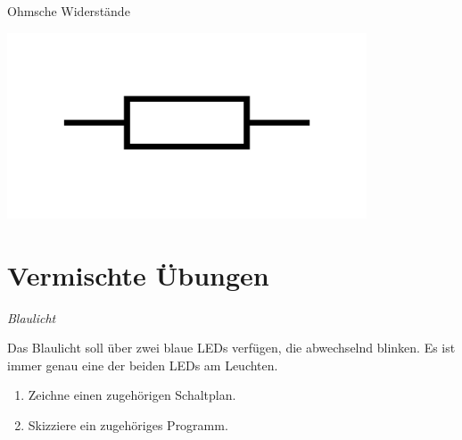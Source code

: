 \begin{zsfg}{Ohmsche Widerstände}
\begin{minipage}{0.33\textwidth}
\begin{minipage}{0.55\textwidth}
		\end{minipage}
		\hfill
		\begin{minipage}{0.43\textwidth}
			\centering
			\includegraphics[width=0.8\textwidth]{./Zeichnungen/widerstand-schaltsymbol.png}
		\end{minipage}
	\end{minipage}
\end{zsfg}


\newpage
\section{Vermischte Übungen}

\begin{aufgabe} \emph{Blaulicht}\label{aufg:blaulicht}
	
	Das Blaulicht soll über zwei blaue LEDs verfügen, die abwechselnd blinken. Es ist immer genau eine der beiden LEDs am Leuchten.
	\begin{enumerate}[label=\alph*), itemsep=0ex]
		\item Zeichne einen zugehörigen Schaltplan.
		\item Skizziere ein zugehöriges Programm.
	\end{enumerate}
\end{aufgabe}

